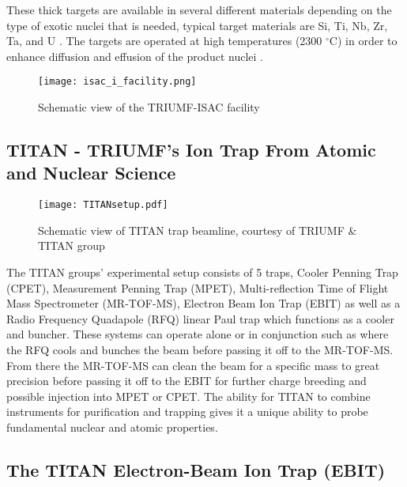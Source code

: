 \documentclass[cnatzke_thesis_proposal.tex]{subfiles}
\begin{document}
These thick targets are available in several different materials depending on the type of exotic nuclei that is needed, typical target materials are Si, Ti, Nb, Zr, Ta, and U \cite{Dilling2014}.  The targets are operated at high temperatures (2300 $^{\circ}$C) in order to enhance diffusion and effusion of the product nuclei \cite{Dombsky2014}.

\begin{center}
\begin{figure}[H]
  \begin{center}
    \texttt{[image: isac\_i\_facility.png]}
  \end{center}
  \caption{Schematic view of the TRIUMF-ISAC facility \cite{Dilling2014}}
  \label{fig:ISAC_HALL}
\end{figure}
\end{center}


\subsection{TITAN - TRIUMF's Ion Trap From Atomic and Nuclear Science \cite{Dilling2006}}

\begin{figure}[H]
  \begin{center}
    \texttt{[image: TITANsetup.pdf]}
  \end{center}
  \caption{Schematic view of TITAN trap beamline, courtesy of TRIUMF \& TITAN group}
  \label{fig:titan_beamline}
\end{figure}

The TITAN groups' experimental setup consists of 5 traps, Cooler Penning Trap (CPET), Measurement Penning Trap (MPET), Multi-reflection Time of Flight Mass Spectrometer (MR-TOF-MS), Electron Beam Ion Trap (EBIT) as well as a Radio Frequency Quadapole (RFQ) linear Paul trap which functions as a cooler and buncher.  These systems can operate alone or in conjunction such as where the RFQ cools and bunches the beam before passing it off to the MR-TOF-MS.  From there the MR-TOF-MS can clean the beam for a specific mass to great precision before passing it off to the EBIT for further charge breeding and possible injection into MPET or CPET.  The ability for TITAN to combine instruments for purification and trapping gives it a unique ability to probe fundamental nuclear and atomic properties.

\subsection{The TITAN Electron-Beam Ion Trap (EBIT)}
\end{document}
